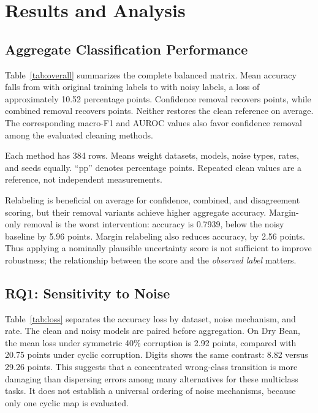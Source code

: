 \chapter{Results and Analysis}
\section{Aggregate Classification Performance}
Table~\ref{tab:overall} summarizes the complete balanced matrix. Mean accuracy
falls from \CleanAccuracy{} with original training labels to \NoisyAccuracy{}
with noisy labels, a loss of approximately 10.52 percentage points. Confidence
removal recovers \ConfidenceRemoveGain{} points, while combined removal recovers
\CombinedRemoveGain{} points. Neither restores the clean reference on average.
The corresponding macro-F1 and AUROC values also favor confidence removal
among the evaluated cleaning methods.

{Each method has 384 rows. Means weight datasets, models, noise types, rates,
and seeds equally. ``pp'' denotes percentage points. Repeated clean values
are a reference, not independent measurements.}

Relabeling is beneficial on average for confidence, combined, and disagreement
scoring, but their removal variants achieve higher aggregate accuracy.
Margin-only removal is the worst intervention: accuracy is 0.7939, below the
noisy baseline by 5.96 points. Margin relabeling also reduces accuracy, by
2.56 points. Thus applying a nominally plausible uncertainty score is not
sufficient to improve robustness; the relationship between the score and the
\emph{observed label} matters.

\section{RQ1: Sensitivity to Noise}
Table~\ref{tab:loss} separates the accuracy loss by dataset, noise mechanism,
and rate. The clean and noisy models are paired before aggregation. On Dry
Bean, the mean loss under symmetric 40\% corruption is 2.92 points, compared
with 20.75 points under cyclic corruption. Digits shows the same contrast:
8.82 versus 29.26 points. This suggests that a concentrated wrong-class
transition is more damaging than dispersing errors among many alternatives
for these multiclass tasks. It does not establish a universal ordering of
noise mechanisms, because only one cyclic map is evaluated.

